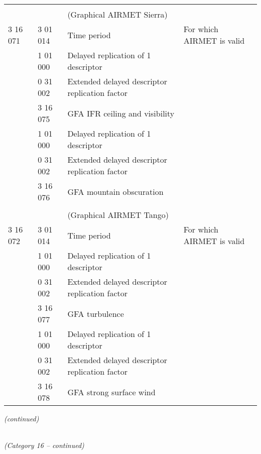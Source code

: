 \begin{longtable}[]{@{}llll@{}}
& & &\tabularnewline
& & (Graphical AIRMET Sierra) &\tabularnewline
3 16 071 & 3 01 014 & Time period & For which AIRMET is valid\tabularnewline
& 1 01 000 & Delayed replication of 1 descriptor &\tabularnewline
& 0 31 002 & Extended delayed descriptor replication factor &\tabularnewline
& 3 16 075 & GFA IFR ceiling and visibility &\tabularnewline
& 1 01 000 & Delayed replication of 1 descriptor &\tabularnewline
& 0 31 002 & Extended delayed descriptor replication factor &\tabularnewline
& 3 16 076 & GFA mountain obscuration &\tabularnewline
& & &\tabularnewline
& & (Graphical AIRMET Tango) &\tabularnewline
3 16 072 & 3 01 014 & Time period & For which AIRMET is valid\tabularnewline
& 1 01 000 & Delayed replication of 1 descriptor &\tabularnewline
& 0 31 002 & Extended delayed descriptor replication factor &\tabularnewline
& 3 16 077 & GFA turbulence &\tabularnewline
& 1 01 000 & Delayed replication of 1 descriptor &\tabularnewline
& 0 31 002 & Extended delayed descriptor replication factor &\tabularnewline
& 3 16 078 & GFA strong surface wind &\tabularnewline
\bottomrule
\end{longtable}

\emph{(continued)}

\emph{\\
(Category 16 -- continued)}

